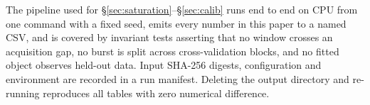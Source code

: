 \documentclass{article}
\begin{document}
The pipeline used for \S\ref{sec:saturation}--\S\ref{sec:calib} runs end to end
on CPU from one command with a fixed seed, emits every number in this paper to
a named CSV, and is covered by invariant tests asserting that no window crosses
an acquisition gap, no burst is split across cross-validation blocks, and no
fitted object observes held-out data. Input SHA-256 digests, configuration and
environment are recorded in a run manifest. Deleting the output directory and
re-running reproduces all tables with zero numerical difference.



\end{document}
